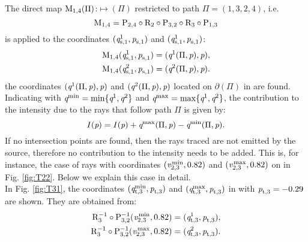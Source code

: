 The direct map $\mathrm{M}_{1,4}(\Pi)$:$\mapsto$$(\Pi)$ restricted to path $\Pi = (1,3,2,4)$, i.e.
\begin{equation}
\mathrm{M}_{1,4} = \mathrm{P}_{2,4}\circ\mathrm{R}_{2}\circ\mathrm{P}_{3,2}\circ\mathrm{R}_{3}\circ\mathrm{P}_{1,3}
\end{equation}
is applied to the coordinates $(\textit{q}_{\textrm{s,} \textit{$1$}}^{1}, \textit{p}_{\textrm{s,} \textit{$1$}})$ and $(\textit{q}_{\textrm{s,} \textit{$1$}}^{1}, \textit{p}_{\textrm{s,} \textit{$1$}})$:
\begin{equation}
\begin{split}
\mathrm{M}_{1,4}(\textit{q}_{\textrm{s,} \textit{$1$}}^{1}, \textit{p}_{\textrm{s,} \textit{$1$}}) &= (\textit{q}^{1}(\Pi, \textit{p}), \textit{p}),\\
\mathrm{M}_{1,4}(\textit{q}_{\textrm{s,} \textit{$1$}}^{2}, \textit{p}_{\textrm{s,} \textit{$1$}}) &= (\textit{q}^{2}(\Pi, \textit{p}), \textit{p}).
\end{split}
\end{equation} 
the coordinates $(\textit{q}^{1}(\Pi, \textit{p}), \textit{p})$ and
  $(\textit{q}^{2}(\Pi, \textit{p}), \textit{p})$ located on $\partial$$(\Pi)$ in  are found.
Indicating with $\textit{q}^{\textrm{min}}= \min\{\textit{q}^{1}, \textit{q}^{2}\}$ and $\textit{q}^{\textrm{max}}= \max\{\textit{q}^{1}, \textit{q}^{2}\}$, the contribution to the intensity due to the rays that follow path $\Pi$ is given by:
\begin{equation}
I(\textit{p}) = I(\textit{p})+\textit{q}^{\textrm{max}}(\Pi, \textit{p})-\textit{q}^{\textrm{min}}(\Pi, \textit{p}). 
\end{equation}
  If no intersection points are found, then the rays traced are
  not emitted by the source, therefore no contribution to the intensity needs to be added. This is, for instance, the case of rays with
  coordinates $(\textit{v}_{2, 3}^\textrm{\,min}, 0.82)$ and $(\textit{v}_{2, 3}^\textrm{\,max}, 0.82)$
  on  in Fig. \ref{fig:T22}. Below we explain this case in detail. \\ \indent
  In Fig. \ref{fig:T31}, the coordinates $(\textit{q}_{\textrm{t,} \textit{$3$}}^{\textrm{min}}, \textit{p}_{\textrm{t,} \textit{$3$}})$ and $(\textit{q}_{\textrm{t,} \textit{$3$}}^{\textrm{max}}, \textit{p}_{\textrm{t,} \textit{$3$}})$ in  with $\textit{p}_{\textrm{t,} \textit{$3$}}=-0.29$ are shown.
  They are obtained from:
\begin{equation}
\begin{split}
 \mathrm{R}_{{3}}^{-1}\circ\mathrm{P}_{{3,2}}^{-1}(\textit{v}_{2, 3}^\textrm{\,min}, 0.82)& = (\textit{q}_{\textrm{t,} \textit{$3$}}^{1}, \textit{p}_{\textrm{t,} \textit{$3$}}),\\
\mathrm{R}_{{3}}^{-1}\circ\mathrm{P}_{{3,2}}^{-1}(\textit{v}_{2, 3}^\textrm{\,max}, 0.82)& = (\textit{q}_{\textrm{t,} \textit{$3$}}^{2}, \textit{p}_{\textrm{t,} \textit{$3$}}).
\end{split}
\end{equation}

